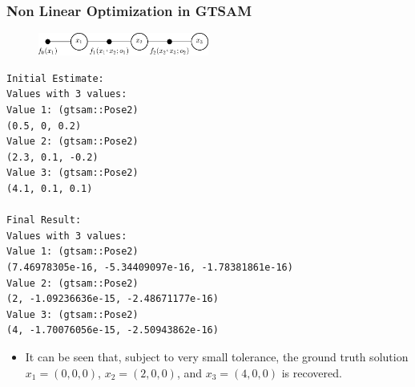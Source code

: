 \begin{frame}[fragile]
    \frametitle{Non Linear Optimization in GTSAM}

    \scriptsize

    \begin{figure}[!h]
        \includegraphics[width=0.5\textwidth]{./images/gtsam/factor_graph_odometry.pdf}
    \end{figure}
\begin{lstlisting}[style=bash] 
Initial Estimate:
Values with 3 values:
Value 1: (gtsam::Pose2)
(0.5, 0, 0.2)
Value 2: (gtsam::Pose2)
(2.3, 0.1, -0.2)
Value 3: (gtsam::Pose2)
(4.1, 0.1, 0.1)

Final Result:
Values with 3 values:
Value 1: (gtsam::Pose2)
(7.46978305e-16, -5.34409097e-16, -1.78381861e-16)
Value 2: (gtsam::Pose2)
(2, -1.09236636e-15, -2.48671177e-16)
Value 3: (gtsam::Pose2)
(4, -1.70076056e-15, -2.50943862e-16)
\end{lstlisting}

    \begin{itemize}
        \item It can be seen that, subject to very small tolerance, the ground truth solution $x_1 = (0,0,0)$, $x_2 = (2,0,0)$, and $x_3 = (4,0,0)$ is recovered.
    \end{itemize}

\end{frame}



